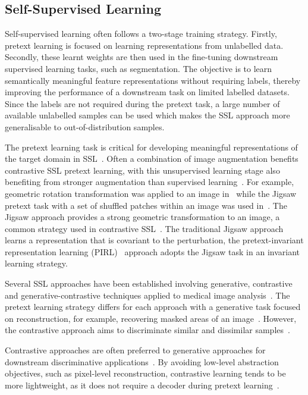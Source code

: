 \subsection{Self-Supervised Learning}
Self-supervised learning often follows a two-stage training strategy. Firstly, pretext learning is focused on learning representations from unlabelled data. Secondly, these learnt weights are then used in the fine-tuning downstream supervised learning tasks, such as segmentation. The objective is to learn semantically meaningful feature representations without requiring labels, thereby improving the performance of a downstream task on limited labelled datasets. Since the labels are not required during the pretext task, a large number of available unlabelled samples can be used which makes the SSL approach more generalisable to out-of-distribution samples. 

The pretext learning task is critical for developing meaningful representations of the target domain in SSL~\cite{vanberlo_survey_2024}. Often a combination of image augmentation benefits contrastive SSL pretext learning, with this unsupervised learning stage also benefiting from stronger augmentation than supervised learning~\cite{chen_simple_2020}. For example, geometric rotation transformation was applied to an image in~\cite{gidaris_unsupervised_2018} while the Jigsaw pretext task with a set of shuffled patches within an image was used in~\cite{leibe_unsupervised_2016}. The Jigsaw approach provides a strong geometric transformation to an image, a common strategy used in contrastive SSL~\cite{z_xu_ssl-cpcd_2024, xie_identification_2024, zhang_twin_2021}. The traditional Jigsaw approach learns a representation that is covariant to the perturbation, the pretext-invariant representation learning (PIRL)~\cite{misra_self-supervised_2020} approach adopts the Jigsaw task in an invariant learning strategy. 

Several SSL approaches have been established involving generative, contrastive and generative-contrastive techniques applied to medical image analysis~\cite{liu_self-supervised_2023}. The pretext learning strategy differs for each approach with a generative task focused on reconstruction, for example, recovering masked areas of an image~\cite{xie_simmim_2022}. However, the contrastive approach aims to discriminate similar and dissimilar samples~\cite {misra_self-supervised_2020}. 

Contrastive approaches are often preferred to generative approaches for downstream discriminative applications~\cite{liu_self-supervised_2023}. By avoiding low-level abstraction objectives, such as pixel-level reconstruction, contrastive learning tends to be more lightweight, as it does not require a decoder during pretext learning~\cite{liu_self-supervised_2023}. 

